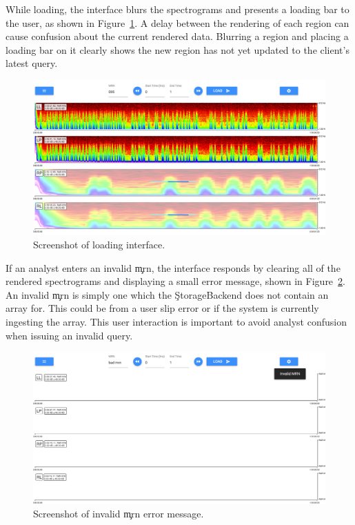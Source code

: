While loading, the interface blurs the spectrograms and presents a loading bar
to the user, as shown in Figure~\ref{fig:loading}. A delay between the
rendering of each region can cause confusion about the current rendered data.
Blurring a region and placing a loading bar on it clearly shows the new region
has not yet updated to the client's latest query. \\

\begin{figure}[h]
\begin{center}
\includegraphics[scale=0.35]{./img/loading.png}
\caption{Screenshot of loading interface.}
\label{fig:loading}
\end{center}
\end{figure}

If an analyst enters an invalid \c{mrn}, the interface responds by clearing all
of the rendered spectrograms and displaying a small error message, shown in
Figure~\ref{fig:error}. An invalid \c{mrn} is simply one which the
\c{StorageBackend} does not contain an array for. This could be from a user slip
error or if the system is currently ingesting the array. This user interaction
is important to avoid analyst confusion when issuing an invalid query. \\

\begin{figure}[h]
\begin{center}
\includegraphics[scale=0.35]{./img/error.png}
\caption{Screenshot of invalid \c{mrn} error message.}
\label{fig:error}
\end{center}
\end{figure}

